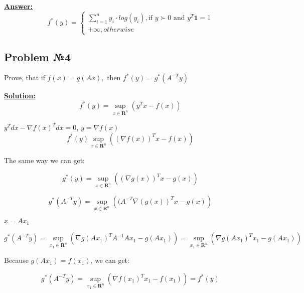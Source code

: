 \underline{\textbf{Answer:}}
\begin{equation*}
f^*(y) = \begin{cases}
    \sum\limits_{i = 1}^n y_i \cdot log(y_i), \text{if } y \succ 0 \text{ and } y^T\mathds{1} = 1 \\
    +\infty, otherwise
\end{cases}    
\end{equation*}

\subsection{Problem №4}
Prove, that if $f(x) = g(Ax),$ then $f^*(y) = g^*(A^{-T}y)$

\underline{\textbf{Solution:}}
\begin{equation*}
f^*(y) = \sup_{x \in \mathbf{R}^n}\left(y^Tx - f(x)  \right)
\end{equation*}

$y^Tdx - \nabla f(x)^Tdx = 0$, $y = \nabla f(x)$
\begin{equation*}
    f^*(y) \sup_{x \in \mathbf{R}^n} \left( (\nabla f(x))^Tx - f(x) \right)
\end{equation*}

The same way we can get:

\begin{equation*}
    g^*(y) = \sup_{x \in \mathbf{R}^n} \left( (\nabla g(x))^Tx - g(x) \right)
\end{equation*}

\begin{equation*}
    g^*(A^{-T}y) = \sup_{x \in \mathbf{R}^n} \left( (A^{-T}\nabla(g(x))^Tx - g(x) \right)
\end{equation*}

$x = Ax_1$

\begin{equation*}
    g^*(A^{-T}y) = \sup_{x_1 \in \mathbf{R}^n} \left( \nabla g(Ax_1)^T A^{-1}Ax_1 - g(Ax_1) \right) = \sup_{x_1 \in \mathbf{R}^n} \left( \nabla g(Ax_1)^Tx_1 - g(Ax_1)
    \right)
\end{equation*}

Because $g(Ax_1) = f(x_1)$, we can get:

\begin{equation*}
    g^*(A^{-T}y) = \sup_{x_1 \in \mathbf{R}^n} \left( \nabla f(x_1)^Tx_1 - f(x_1)\right) = f^*(y)
\end{equation*}
    
